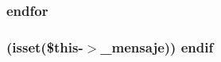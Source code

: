 \subsubsection[{endfor}]{\setlength{\rightskip}{0pt plus 5cm}endfor}\label{header_8php_ae8fdc27183f296411bac00ed522ee1ac}
\hypertarget{header_8php_a7919c3af50b9977dac531548423051e3}{}
\subsubsection[{endif}]{ (isset(\$this-\/$>$\+\_\+mensaje)) endif}\label{header_8php_a7919c3af50b9977dac531548423051e3}
